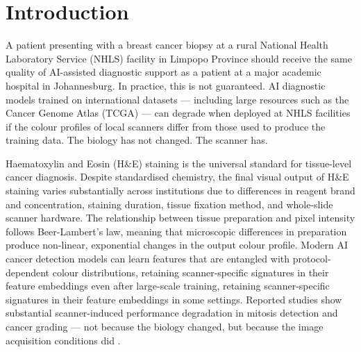 \documentclass[a4paper,twoside,12pt]{report}
\begin{document}
{}
\tableofcontents
\newpage
{}
{}
\listoffigures
\newpage
{}
{}
\listoftables
\newpage
{}


\chapter{Introduction}

A patient presenting with a breast cancer biopsy at a rural National Health Laboratory Service (NHLS) facility in Limpopo Province should receive the same quality of AI-assisted diagnostic support as a patient at a major academic hospital in Johannesburg. In practice, this is not guaranteed. AI diagnostic models trained on international datasets --- including large resources such as the Cancer Genome Atlas (TCGA) --- can degrade when deployed at NHLS facilities if the colour profiles of local scanners differ from those used to produce the training data. The biology has not changed. The scanner has.

Haematoxylin and Eosin (H\&E) staining is the universal standard for tissue-level cancer diagnosis. Despite standardised chemistry, the final visual output of H\&E staining varies substantially across institutions due to differences in reagent brand and concentration, staining duration, tissue fixation method, and whole-slide scanner hardware. The relationship between tissue preparation and pixel intensity follows Beer-Lambert's law, meaning that microscopic differences in preparation produce non-linear, exponential changes in the output colour profile. Modern AI cancer detection models can learn features that are entangled with protocol-dependent colour distributions, retaining scanner-specific signatures in their feature embeddings even after large-scale training, retaining scanner-specific signatures in their feature embeddings in some settings. Reported studies show substantial scanner-induced performance degradation in mitosis detection and cancer grading --- not because the biology changed, but because the image acquisition conditions did \citep{breen2024gans}.
\end{document}
